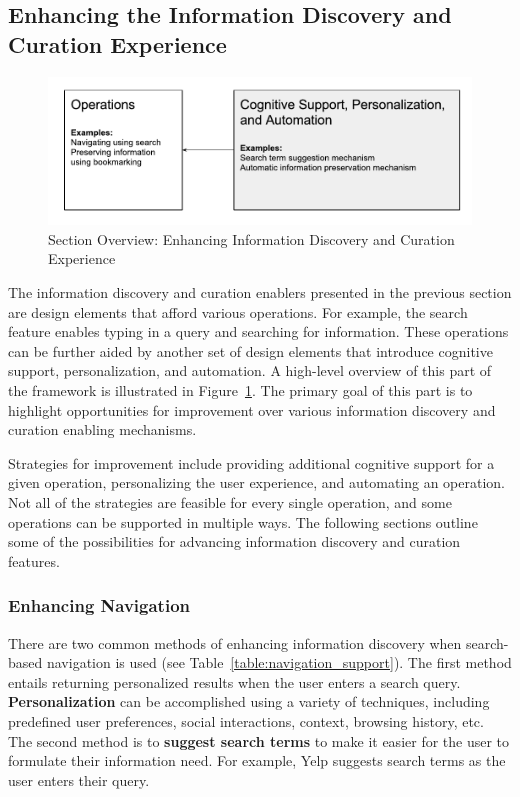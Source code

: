 \documentclass{sigchi}
\begin{document}
{\subsection{Enhancing the Information Discovery and Curation Experience}

\begin{figure}[ht!]
	\noindent
	\centering
    \includegraphics[width=\linewidth]{figures/enhancement.pdf}
	\caption{Section Overview: Enhancing Information Discovery and Curation Experience}
	\label{fig:enhancement} 
\end{figure}
The information discovery and curation enablers presented in the previous section are design elements that afford various operations. For example, the search feature enables typing in a query and searching for information. These operations can be further aided by another set of design elements that introduce cognitive support, personalization, and automation. A high-level overview of this part of the framework is illustrated in Figure~\ref{fig:enhancement}. The primary goal of this part is to highlight opportunities for improvement over various information discovery and curation enabling mechanisms.

Strategies for improvement include providing additional cognitive support for a given operation, personalizing the user experience, and automating an operation. Not all of the strategies are feasible for every single operation, and some operations can be supported in multiple ways. The following sections outline some of the possibilities for advancing information discovery and curation features. 

{\subsubsection{Enhancing Navigation}
There are two common methods of enhancing information discovery when search-based navigation is used (see Table~\ref{table:navigation_support}). The first method entails returning personalized results when the user enters a search query. \textbf{Personalization} can be accomplished using a variety of techniques, including predefined user preferences, social interactions, context, browsing history, etc. The second method is to \textbf{suggest search terms} to make it easier for the user to formulate their information need. For example, Yelp suggests search terms as the user enters their query.

}}
\end{document}
